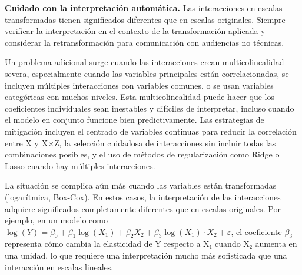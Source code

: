 \documentclass[
  letterpaper,
  DIV=11,
  numbers=noendperiod]{scrreprt}
\begin{document}
\begin{tcolorbox}[enhanced jigsaw, breakable, toprule=.15mm, bottomtitle=1mm, coltitle=black, colbacktitle=quarto-callout-warning-color!10!white, titlerule=0mm, opacitybacktitle=0.6, bottomrule=.15mm, toptitle=1mm, title=\textcolor{quarto-callout-warning-color}{\faExclamationTriangle}\hspace{0.5em}{Advertencia sobre interpretación}, arc=.35mm, rightrule=.15mm, opacityback=0, colframe=quarto-callout-warning-color-frame, leftrule=.75mm, left=2mm, colback=white]

\textbf{Cuidado con la interpretación automática.} Las interacciones en
escalas transformadas tienen significados diferentes que en escalas
originales. Siempre verificar la interpretación en el contexto de la
transformación aplicada y considerar la retransformación para
comunicación con audiencias no técnicas.

\end{tcolorbox}

Un problema adicional surge cuando las interacciones crean
multicolinealidad severa, especialmente cuando las variables principales
están correlacionadas, se incluyen múltiples interacciones con variables
comunes, o se usan variables categóricas con muchos niveles. Esta
multicolinealidad puede hacer que los coeficientes individuales sean
inestables y difíciles de interpretar, incluso cuando el modelo en
conjunto funcione bien predictivamente. Las estrategias de mitigación
incluyen el centrado de variables continuas para reducir la correlación
entre X y X×Z, la selección cuidadosa de interacciones sin incluir todas
las combinaciones posibles, y el uso de métodos de regularización como
Ridge o Lasso cuando hay múltiples interacciones.

La situación se complica aún más cuando las variables están
transformadas (logarítmica, Box-Cox). En estos casos, la interpretación
de las interacciones adquiere significados completamente diferentes que
en escalas originales. Por ejemplo, en un modelo como
\(\log(Y) = \beta_0 + \beta_1 \log(X_1) + \beta_2 X_2 + \beta_3 \log(X_1) \cdot X_2 + \varepsilon\),
el coeficiente \(\beta_3\) representa cómo cambia la elasticidad de Y
respecto a X₁ cuando X₂ aumenta en una unidad, lo que requiere una
interpretación mucho más sofisticada que una interacción en escalas
lineales.
\end{document}
